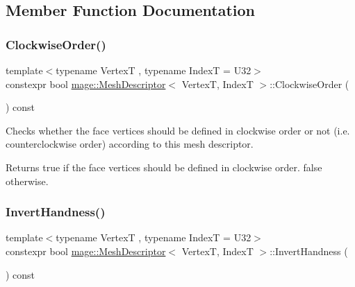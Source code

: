 \subsection{Member Function Documentation}
\hypertarget{structmage_1_1_mesh_descriptor_a4694588682a42e5abf7c10e33a48d9bf}{}\label{structmage_1_1_mesh_descriptor_a4694588682a42e5abf7c10e33a48d9bf} 
\subsubsection{\texorpdfstring{Clockwise\+Order()}{ClockwiseOrder()}}
{\footnotesize\ttfamily template$<$typename VertexT , typename IndexT  = U32$>$ \\
constexpr bool \hyperlink{structmage_1_1_mesh_descriptor}{mage\+::\+Mesh\+Descriptor}$<$ VertexT, IndexT $>$\+::Clockwise\+Order (\begin{DoxyParamCaption}{ }\end{DoxyParamCaption}) const\hspace{0.3cm}{\ttfamily [noexcept]}}

Checks whether the face vertices should be defined in clockwise order or not (i.\+e. counterclockwise order) according to this mesh descriptor.

\begin{DoxyReturn}{Returns}
{\ttfamily true} if the face vertices should be defined in clockwise order. {\ttfamily false} otherwise. 
\end{DoxyReturn}
\hypertarget{structmage_1_1_mesh_descriptor_a570ac8d10bafca62cc24226434c817e8}{}\label{structmage_1_1_mesh_descriptor_a570ac8d10bafca62cc24226434c817e8} 
\subsubsection{\texorpdfstring{Invert\+Handness()}{InvertHandness()}}
{\footnotesize\ttfamily template$<$typename VertexT , typename IndexT  = U32$>$ \\
constexpr bool \hyperlink{structmage_1_1_mesh_descriptor}{mage\+::\+Mesh\+Descriptor}$<$ VertexT, IndexT $>$\+::Invert\+Handness (\begin{DoxyParamCaption}{ }\end{DoxyParamCaption}) const\hspace{0.3cm}{\ttfamily [noexcept]}}

